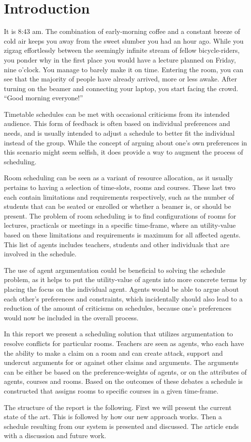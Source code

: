 \section{Introduction}
It is 8:43 am. The combination of early-morning coffee and a constant
breeze of cold air keeps you away from the sweet slumber you had an hour
ago. While you zigzag effortlessly between the seemingly infinite stream
of fellow bicycle-riders, you ponder why in the first place you would have
a lecture planned on Friday, nine o'clock. You manage to barely make it on
time. Entering the room, you can see that the majority of people have
already arrived, more or less awake. After turning on the beamer and
connecting your laptop, you start facing the crowd. ``Good morning
everyone!''

Timetable schedules can be met with occasional criticisms from its intended
audience. This form of feedback is often based on individual preferences
and needs, and is usually intended to adjust a schedule to better fit the
individual instead of the group. While the concept of arguing about one's
own preferences in this scenario might seem selfish, it does provide a way
to augment the process of scheduling.

Room scheduling can be seen as a variant of resource allocation, as it
usually pertains to having a selection of time-slots, rooms and courses.
These last two each contain limitations and requirements respectively, such
as the number of students that can be seated or enrolled or whether a
beamer is, or should be present. The problem of room scheduling is to find
configurations of rooms for lectures, practicals or meetings in a specific
time-frame, where an utility-value based on these limitations and
requirements is maximum for all affected agents. This list of agents
includes teachers, students and other individuals that are involved in the
schedule.            

The use of agent argumentation could be beneficial to solving the schedule
problem, as it helps to put the utility-value of agents into more concrete
terms by placing the focus on the individual agent. Agents would be able to
argue about each other's preferences and constraints, which incidentally
should also lead to a reduction of the amount of criticisms on schedules,
because one's preferences would now be included in the overall process. 

In this report we present a scheduling solution that utilizes argumentation 
to resolve conflicts for particular rooms. Teachers are seen as agents, who 
each have the ability to make a claim on a room and can create attack, 
support and undercut arguments for or against other claims and arguments. 
The arguments can be either be based on the preference-weights of agents, 
or on the attributes of agents, courses and rooms. Based on the outcomes of 
these debates a schedule is constructed that assigns rooms to specific 
courses in a given time-frame.

The structure of the report is the following. First we will present the
current state of the art. This is followed by how our new approach works.
Then a schedule resulting from our system is presented and discussed. The
article ends with a discussion and future work.
